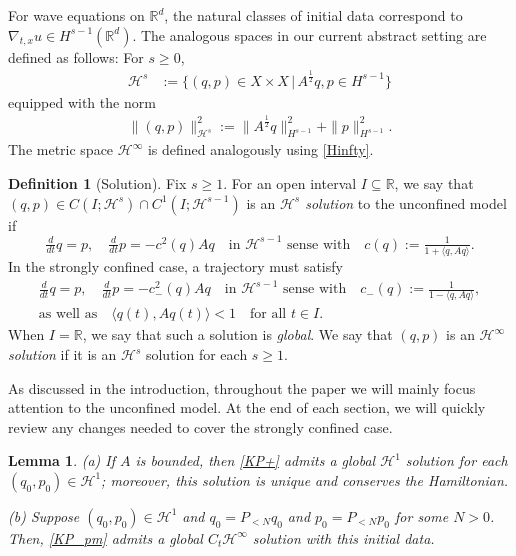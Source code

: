 \documentclass{amsart}
\newcommand{\R}{{\mathbb{R}}}
\newcommand{\qtq}[1]{\quad\text{#1}\quad}
\newtheorem{lemma}[theorem]{Lemma}
\theoremstyle{definition}
\newtheorem{definition}[theorem]{Definition}
\numberwithin{equation}{section}
\renewcommand{\H}{\mathcal H}
\begin{document}
For wave equations on $\R^d$, the natural classes of initial data correspond to $\nabla_{t,x} u \in H^{s-1}(\R^d)$. The analogous spaces in our current abstract setting are defined as follows:  For $s \geq 0$,
\begin{equation}\label{Hs def}
\begin{aligned}
\H^s &:=\{(q,p)\in X\times X\, |\, A^{\frac12}q, p \in H^{s-1}\}
\end{aligned}
\end{equation}
equipped with the norm
\begin{align}\label{Hs norm}
\|(q,p)\|_{\H^s}^2:= \|A^{\frac12}q\|_{H^{s-1}}^2+ \|p\|_{H^{s-1}}^2.
\end{align}
The metric space $\H^\infty$ is defined analogously using \eqref{Hinfty}.

\begin{definition}[Solution]
Fix $s\geq 1$. For an open interval $I\subseteq \R$, we say that $(q,p)\in C(I;\H^s)\cap C^1(I; \H^{s-1})$ is an \emph{$\H^s$ solution} to the unconfined model if
\begin{equation}\label{KP+}
\tfrac{d}{dt}q = p, \quad \tfrac{d}{dt}p = -c^2(q) A q \qtq{in $\H^{s-1}$ sense with}c(q) := \tfrac{1}{1 + \langle q,A q\rangle} .
\end{equation}
In the strongly confined case, a trajectory must satisfy
\begin{equation}\label{KP-}
\begin{gathered}
\tfrac{d}{dt}q = p, \quad \tfrac{d}{dt}p = -c_-^2(q) A q \qtq{in $\H^{s-1}$ sense with}c_-(q) := \tfrac{1}{1 - \langle q,A q\rangle},\\
\text{as well as} \quad  \langle q(t),A q(t)\rangle < 1 \quad\text{for all $t\in I$.}
\end{gathered}
\end{equation}
When $I=\R$, we say that such a solution is \emph{global}. We say that $(q,p)$ is an \emph{$\H^\infty$ solution} if it is an $\H^s$ solution for each $s\geq 1$.
\end{definition}

As discussed in the introduction, throughout the paper we will mainly focus attention to the unconfined model. At the end of each section, we will quickly review any changes needed to cover the strongly confined case.


\begin{lemma}\label{L:GWP}
{\upshape(a)} If $A$ is bounded, then \eqref{KP+} admits a global $\H^1$ solution for each $(q_0,p_0)\in \H^1$; moreover, this solution is unique and conserves the Hamiltonian.

{\upshape(b)} Suppose $(q_0,p_0)\in \H^1$ and $q_0=P_{<N}q_0$ and $p_0= P_{<N}p_0$ for some $N>0$.  Then, \eqref{KP_pm} admits a global $C_t \H^\infty$ solution with this initial data. 
\end{lemma}
\end{document}

